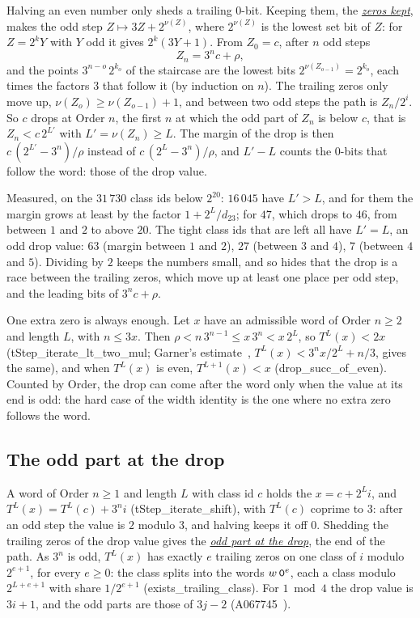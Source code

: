 \documentclass[10pt,a4paper,titlepage]{article}
\makeatletter
\newcommand{\termhere}[1]{\leavevmode
  \Hy@raisedlink{\hyper@anchorstart{term:#1}\hyper@anchorend}}
\newcommand{\keyterm}[2]{\hyperlink{box:#1}{\emph{#2}}}
\newcommand{\lean}[1]{\textsf{#1}}
\makeatother
\begin{document}
\termhere{zeroskept}Halving an even number only sheds a trailing $0$-bit. Keeping them, the \keyterm{zeroskept}{zeros kept}, makes the odd step
$Z \mapsto 3Z + 2^{\nu(Z)}$, where $2^{\nu(Z)}$ is the lowest set bit of $Z$: for $Z = 2^k Y$
with $Y$ odd it gives $2^k(3Y + 1)$. From $Z_0 = c$, after $n$ odd steps
\[
Z_n = 3^n c + \rho ,
\]
and the points $3^{n-o}\,2^{k_o}$ of the staircase are the lowest bits $2^{\nu(Z_{o-1})} = 2^{k_o}$,
each times the factors $3$ that follow it (by induction on $n$). The trailing zeros only move
up, $\nu(Z_o) \ge \nu(Z_{o-1}) + 1$, and between two odd steps the path is $Z_n/2^i$. So $c$
drops at Order $n$, the first $n$ at which the odd part of $Z_n$ is below $c$, that is $Z_n < c\,2^{L'}$ with
$L' = \nu(Z_n) \ge L$. The margin of the drop is then $c\,(2^{L'} - 3^n)/\rho$ instead of
$c\,(2^L - 3^n)/\rho$, and $L' - L$ counts the $0$-bits that follow the word: those of the drop value.

Measured, on the $31\,730$ class ids below $2^{20}$: $16\,045$ have $L' > L$, and for them the
margin grows at least by the factor $1 + 2^L/d_{23}$; for $47$, which drops to $46$, from
between $1$ and $2$ to above $20$. The tight class ids that are left all have $L' = L$, an odd
drop value: $63$ (margin between $1$ and $2$), $27$ (between $3$ and $4$), $7$ (between $4$ and $5$). Dividing by $2$ keeps the numbers small, and so hides
that the drop is a race between the trailing zeros, which move up at least one place per odd
step, and the leading bits of $3^n c + \rho$.

One extra zero is always enough. Let $x$ have an admissible word of Order $n \ge 2$ and
length $L$, with $n \le 3x$. Then $\rho < n\,3^{n-1} \le x\,3^n < x\,2^L$, so
$T^L(x) < 2x$ (\lean{tStep\_iterate\_lt\_two\_mul}; Garner's estimate~\cite{Garner1981},
$T^{L}(x) < 3^n x/2^L + n/3$, gives the same), and when $T^L(x)$ is even, $T^{L+1}(x) < x$
(\lean{drop\_succ\_of\_even}). Counted by Order, the drop can come after the word only when
the value at its end is odd: the hard case of the width identity is the one where no extra
zero follows the word.

\subsection*{The odd part at the drop}

\termhere{oddpartdrop}A word of Order $n \ge 1$ and length $L$ with class id $c$ holds the
$x = c + 2^L i$, and $T^L(x) = T^L(c) + 3^n i$ (\lean{tStep\_iterate\_shift}), with
$T^L(c)$ coprime to $3$: after an odd step the value is $2$ modulo $3$, and halving keeps it
off $0$. Shedding the trailing zeros of the drop value gives the
\keyterm{oddpartdrop}{odd part at the drop}, the end of the path. As $3^n$ is odd, $T^L(x)$
has exactly $e$ trailing zeros on one class of $i$ modulo $2^{e+1}$, for every $e \ge 0$: the
class splits into the words $w\,\text{\texttt{0}}^e$, each a class modulo $2^{L+e+1}$ with share
$1/2^{e+1}$ (\lean{exists\_trailing\_class}). For $1 \bmod 4$ the drop value is $3i + 1$, and the odd parts are those of
$3j - 2$ (A067745~\cite{OEIS_A067745}).
\end{document}

